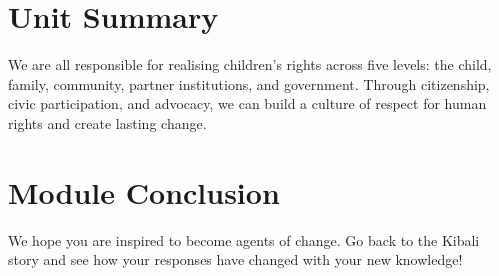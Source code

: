 \documentclass[12pt,a4paper]{article}
\begin{document}
\section*{Unit Summary}
We are all responsible for realising children's rights across five levels: the child, family, community, partner institutions, and government. Through citizenship, civic participation, and advocacy, we can build a culture of respect for human rights and create lasting change.

\section*{Module Conclusion}
We hope you are inspired to become agents of change. Go back to the Kibali story and see how your responses have changed with your new knowledge!
\end{document}
